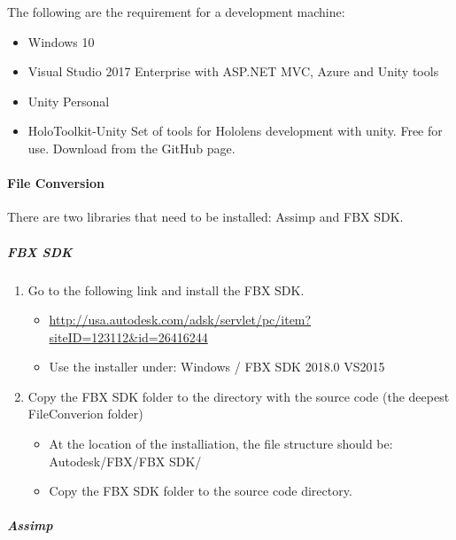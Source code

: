 The following are the requirement for a development machine:
\begin{itemize}
    \item Windows 10
    \item Visual Studio 2017 Enterprise with ASP.NET MVC, Azure and Unity tools
    \item Unity Personal
    \item HoloToolkit-Unity Set of tools for Hololens development with unity. Free for use. Download from the GitHub page.
\end{itemize}

\paragraph{File Conversion}

There are two libraries that need to be installed: Assimp and FBX SDK.

\subparagraph{FBX SDK}

\begin{enumerate}
    \item Go to the following link and install the FBX SDK.
    \begin{itemize}
        \item \url{http://usa.autodesk.com/adsk/servlet/pc/item?siteID=123112&id=26416244}
        \item Use the installer under: Windows / FBX SDK 2018.0 VS2015
    \end{itemize}

    \item Copy the FBX SDK folder to the directory with the source code (the deepest FileConverion folder)
    \begin{itemize}
        \item At the location of the installiation, the file structure should be: Autodesk/FBX/FBX SDK/
        \item Copy the FBX SDK folder to the source code directory.
    \end{itemize}
\end{enumerate}

\subparagraph{Assimp}

